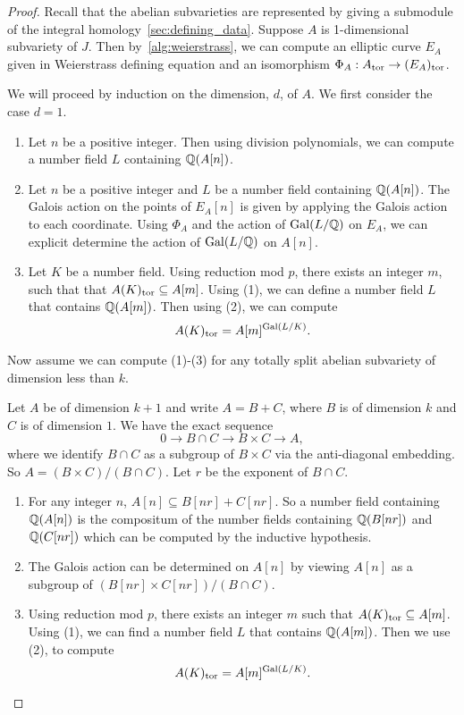 \documentclass[11pt, proquest]{uwthesis}
\begin{document}
\begin{proof}
    Recall that the abelian subvarieties are represented by giving a submodule
    of the integral homology~\ref{sec:defining_data}. Suppose $A$ is
    1-dimensional subvariety of $J$. Then by~\ref{alg:weierstrass}, we can
    compute an elliptic curve $E_A$ given in Weierstrass defining equation and
    an isomorphism $\Phi_A:A_{\mathrm{tor}}\to (E_A)_{\mathrm{tor}}$.

    We will proceed by induction on the dimension, $d$, of $A$. We first
    consider the case $d=1$.
    \begin{enumerate}
        \item
            Let $n$ be a positive integer. Then using division polynomials, we
            can compute a number field $L$ containing $\mathbb{Q}(A[n])$.
        \item
            Let $n$ be a positive integer and $L$ be a number field containing
            $\mathbb{Q}(A[n])$. The Galois action on the points of $E_A[n]$ is given
            by applying the Galois action to each coordinate. Using $\Phi_A$
            and the action of $\operatorname{Gal}(L/\mathbb{Q})$ on $E_A$, we can explicit determine
            the action of $\operatorname{Gal}(L/\mathbb{Q})$ on $A[n]$.
        \item
            Let $K$ be a number field. Using reduction mod $p$, there exists an
            integer $m$, such that that $A(K)_{\mathrm{tor}} \subseteq A[m]$. Using (1),
            we can define a number field $L$ that contains $\mathbb{Q}(A[m])$. Then
            using (2), we can compute
            \[
                A(K)_{\mathrm{tor}} = A[m]^{\operatorname{Gal}(L/K)}.
            \]
    \end{enumerate}

    Now assume we can compute (1)-(3) for any totally split abelian subvariety
    of dimension less than $k$.

    Let $A$ be of dimension $k+1$ and write $A=B+C$, where $B$ is of
    dimension $k$ and $C$ is of dimension $1$.  We have the exact sequence
    \[
        0\to B\cap C \to B\times C \to A,
    \]
    where we identify $B\cap C$ as a subgroup of $B\times C$ via the
    anti-diagonal embedding. So $A=(B\times C)/(B\cap C)$. Let $r$ be the
    exponent of $B\cap C$.
    \begin{enumerate}
        \item
            For any integer $n$, $A[n] \subseteq B[nr]+C[nr]$. So a number
            field containing $\mathbb{Q}(A[n])$ is the compositum  of the number
            fields containing $\mathbb{Q}(B[nr])$ and $\mathbb{Q}(C[nr])$ which can be
            computed by the inductive hypothesis.
        \item
            The Galois action can be determined on $A[n]$ by viewing $A[n]$ as
            a subgroup of $(B[nr]\times C[nr])/(B\cap C)$.
        \item
            Using reduction mod $p$, there exists an integer $m$ such that
            $A(K)_{\mathrm{tor}}\subseteq A[m]$. Using (1), we can find a number field
            $L$ that contains $\mathbb{Q}(A[m])$. Then we use (2), to compute
            \[
                A(K)_{\mathrm{tor}} = A[m]^{\operatorname{Gal}(L/K)}.
            \]
    \end{enumerate}
\end{proof}
\end{document}
